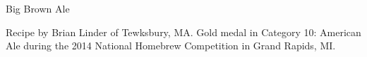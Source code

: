 \begin{recipe}{Big Brown Ale}

\begin{aboutblock}
Recipe by Brian Linder of Tewksbury, MA. Gold medal in Category 10: American
Ale during the 2014 National Homebrew Competition in Grand Rapids, MI.
\sourceaha
\end{aboutblock}


\begin{methodandtiming}

\begin{mashsteps}
\end{mashsteps}

\begin{fermentationsteps}
\end{fermentationsteps}

\end{methodandtiming}

\recipebreak

\begin{ingredientsblock}

\begin{malts}
\end{malts}

\begin{hops}
\end{hops}


\end{ingredientsblock}

\end{recipe}

